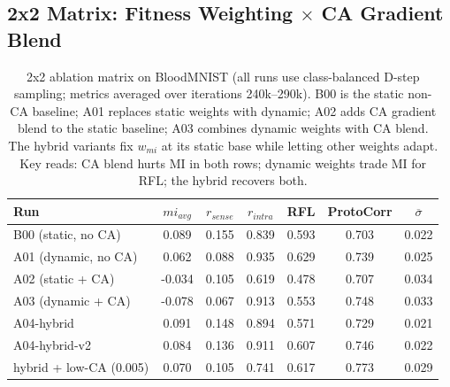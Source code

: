 \documentclass[letterpaper]{article} %
\begin{document}
\subsection{2x2 Matrix: Fitness Weighting $\times$ CA Gradient Blend}

\begin{table}[t]
\centering
\caption{2x2 ablation matrix on BloodMNIST (all runs use class-balanced D-step sampling; metrics averaged over iterations 240k--290k). B00 is the static non-CA baseline; A01 replaces static weights with dynamic; A02 adds CA gradient blend to the static baseline; A03 combines dynamic weights with CA blend. The hybrid variants fix $w_{mi}$ at its static base while letting other weights adapt. Key reads: CA blend hurts MI in both rows; dynamic weights trade MI for RFL; the hybrid recovers both.}
\label{tab:ablation_2x2}
\small
\begin{tabular}{lcccccc}
\toprule
Run & $mi_{avg}$ & $r_{sense}$ & $r_{intra}$ & RFL & ProtoCorr & $\overline{\sigma}$ \\
\midrule
B00 (static, no CA)       &  0.089 & 0.155 & 0.839 & 0.593 & 0.703 & 0.022 \\
A01 (dynamic, no CA)      &  0.062 & 0.088 & 0.935 & 0.629 & 0.739 & 0.025 \\
A02 (static + CA)         & -0.034 & 0.105 & 0.619 & 0.478 & 0.707 & 0.034 \\
A03 (dynamic + CA)        & -0.078 & 0.067 & 0.913 & 0.553 & 0.748 & 0.033 \\
\midrule
A04-hybrid                &  0.091 & 0.148 & 0.894 & 0.571 & 0.729 & 0.021 \\
A04-hybrid-v2             &  0.084 & 0.136 & 0.911 & 0.607 & 0.746 & 0.022 \\
hybrid + low-CA (0.005)   &  0.070 & 0.105 & 0.741 & 0.617 & 0.773 & 0.029 \\
\bottomrule
\end{tabular}
\end{table}
\end{document}
